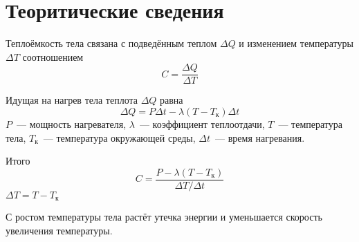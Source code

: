 \section{Теоритические сведения}
Теплоёмкость тела связана с подведённым теплом $\Delta Q$ и изменением температуры $\Delta T$
соотношением \[C=\frac{\Delta Q}{\Delta T}\]

Идущая на нагрев тела теплота $\Delta Q$ равна
\[\Delta Q = P\Delta t - \lambda \left(T-T_{\text{к}}\right)\Delta t\]
$P$~--- мощность нагревателя, $\lambda$~--- коэффициент теплоотдачи,
$T$~--- температура тела, $T_{\text{к}}$~--- температура окружающей среды,
$\Delta t$~--- время нагревания.

Итого
\[C=\frac{P-\lambda\left(T-T_{\text{к}}\right)}{\Delta T/\Delta t}\]
$\Delta T = T - T_{\text{к}}$

С ростом температуры тела растёт утечка энергии и уменьшается скорость увеличения температуры.
